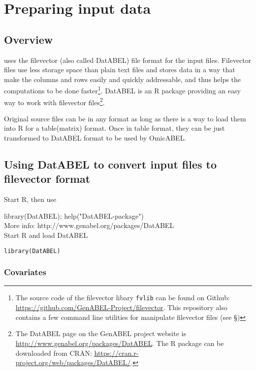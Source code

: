 \chapter{Preparing input data}

\section{Overview}

\oanomm uses the filevector (also called DatABEL) file format for the
input files. Filevector files use less storage space than plain text
files and stores data in a way that make the columns and rows easily
and quickly addressable, and thus helps the computations to be done
faster\footnote{The source code of the filevector libary
  \lstinline{fvlib} can be found on Github:
  \url{https://github.com/GenABEL-Project/filevector}. This repository
  also contains a few command line utilities for manipulate filevector
  files (see \S)}. DatABEL is an R package providing an easy way to work
with filevector files\footnote{The DatABEL page on the GenABEL project
  website is \url{http://www.genabel.org/packages/DatABEL}. The R
  package can be downloaded from CRAN:
  \url{https://cran.r-project.org/web/packages/DatABEL/}.}.


Original source files can be in any format as long as there is a way
to load them into R for a table(matrix) format. Once in table format,
they can be just transformed to DatABEL format to be used by OmicABEL.


\section{Using DatABEL to convert input files to filevector format}
Start R, then use

library(DatABEL); help("DatABEL-package")\\
More info: http://www.genabel.org/packages/DatABEL\\
Start R and load DatABEL

\begin{lstlisting}[escapechar=\%]
library(DatABEL)
\end{lstlisting}

\subsection{Covariates}

